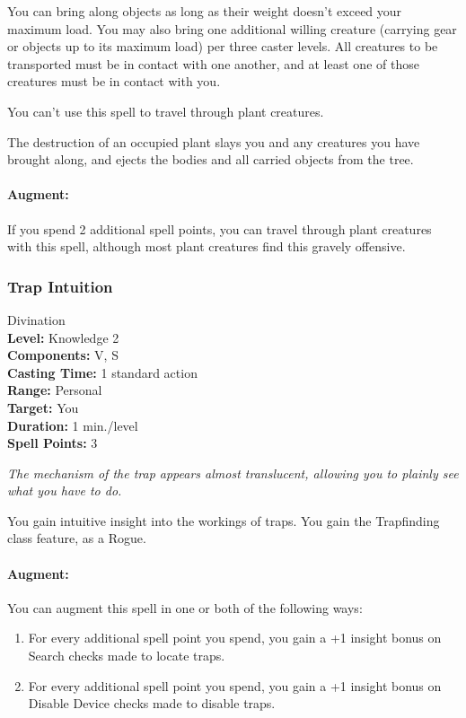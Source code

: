 You can bring along objects as long as their weight doesn't exceed your maximum load. You may also bring one additional willing creature (carrying gear or objects up to its maximum load) per three caster levels. 
All creatures to be transported must be in contact with one another, and at least one of those creatures must be in contact with you.

You can't use this spell to travel through plant creatures.

The destruction of an occupied plant slays you and any creatures you have brought along, and ejects the bodies and all carried objects from the tree.

\paragraph{Augment:} 
If you spend 2 additional spell points, you can travel through plant creatures with this spell, although most plant creatures find this gravely offensive.
\subsubsection{Trap Intuition}
\label{Spell:TrapIntuition}
Divination
\\ \textbf{Level:} Knowledge 2
\\ \textbf{Components:} V, S
\\ \textbf{Casting Time:} 1 standard action
\\ \textbf{Range:} Personal
\\ \textbf{Target:} You
\\ \textbf{Duration:} 1 min./level
\\ \textbf{Spell Points:} 3

\emph{The mechanism of the trap appears almost translucent, allowing you to plainly see what you have to do.}

You gain intuitive insight into the workings of traps. 
You gain the Trapfinding class feature, as a Rogue.

\paragraph{Augment:} You can augment this spell in one or both of the following ways:
\begin{enumerate}
 \item For every additional spell point you spend, you gain a +1 insight bonus on Search checks made to locate traps.
 \item For every additional spell point you spend, you gain a +1 insight bonus on Disable Device checks made to disable traps.
\end{enumerate}
